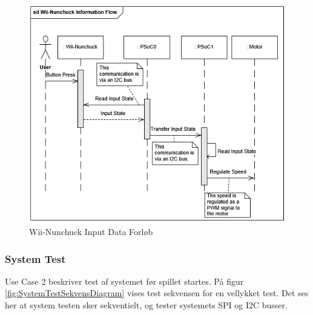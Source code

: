\begin{figure}[H]
	\centering
	\includegraphics[width=\textwidth] {Systemarkitektur/images/WiiNunchuckSequenceDiagram}
	\caption{Wii-Nunchuck Input Data Forløb}
	\label{fig:WiiNunchuckSekvensDiagram}
\end{figure}

\subsubsection{System Test}
Use Case 2 beskriver test af systemet før spillet startes. På figur \ref{fig:SystemTestSekvensDiagram} vises test sekvensen for en vellykket test. Det ses her at system testen sker sekventielt, og tester systemets SPI og I2C busser.

